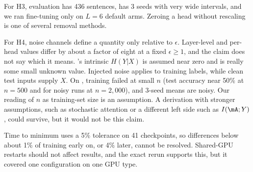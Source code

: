 For H3, \sst evaluation has 436 sentences, \bert has 3 seeds with very wide intervals, and we ran fine-tuning only on $L=6$ default arms. Zeroing a head without rescaling is one of several removal methods.

For H4, noise channels define a quantity only relative to $\epsilon$. Layer-level and per-head values differ by about a factor of eight at a fixed $\epsilon\ge1$, and the claim does not say which it means. \agnews's intrinsic $H(Y|X)$ is assumed near zero and is really some small unknown value. Injected noise applies to training labels, while clean test inputs supply $X$. On \order, training failed at small $n$ (test accuracy near 50\% at $n=500$ and for noisy runs at $n=2{,}000$), and 3-seed means are noisy. Our reading of $n$ as training-set size is an assumption. A derivation with stronger assumptions, such as stochastic attention or a different left side such as $I(\mA;Y)$, could survive, but it would not be this claim.

Time to minimum uses a 5\% tolerance on 41 checkpoints, so differences below about 1\% of training early on, or 4\% later, cannot be resolved. Shared-GPU restarts should not affect results, and the exact rerun supports this, but it covered one configuration on one GPU type.
